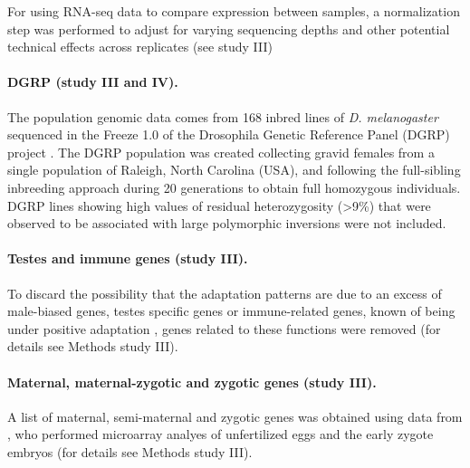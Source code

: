 For using RNA-seq data to compare expression between samples, a normalization step was performed to adjust for varying sequencing depths and other potential technical effects across replicates (see study III)

\paragraph{DGRP (study III and IV).}

The population genomic data comes from 168 inbred lines of \textit{D. melanogaster} sequenced in the Freeze 1.0 of the Drosophila Genetic Reference Panel (DGRP) project \citep{Mackay2012}. The DGRP population was created collecting gravid females from a single population of Raleigh, North Carolina (USA), and following the full-sibling inbreeding approach during 20 generations to obtain full homozygous individuals. 
DGRP lines showing high values of residual heterozygosity (>9\%) that were observed to be associated with large polymorphic inversions \citep{Huang2014} were not included.

\paragraph{Testes and immune genes (study III).}
To discard the possibility that the adaptation patterns are due to an excess of male-biased genes, testes specific genes or immune-related genes, known of being under positive adaptation \citep{Civetta1995,Swanson2001,Artieri2009,Obbard2009}, genes related to these functions were removed (for details see Methods study III).

\paragraph{Maternal, maternal-zygotic and zygotic genes (study III).}
A list of maternal, semi-maternal and zygotic genes was obtained using data from \citet{Thomsen2010}, who performed microarray analyes of unfertilized eggs and the early zygote embryos (for details see Methods study III).